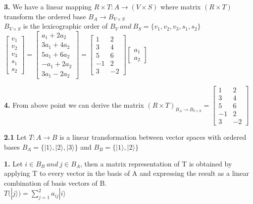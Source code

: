 \documentclass [12pt]{article}
\theoremstyle{definition}
\begin{document}
\phantom{1em} {\bf 3.} We have a linear mapping $R \times T : A \rightarrow (V \times S)$ where matrix $(R \times T)$ transform the ordered base $B_{A} \rightarrow B_{V \times S}$ \\
\phantom{1000em} $B_{V \times S}$ is the lexicographic order of $B_{V} \ and \ B_{S} = \{ v_{1}, v_{2}, v_{3}, s_{1}, s_{2}\}$ \\
\phantom{1000em} $ \begin{bmatrix} v_{1} \\ v_{2} \\ v_{3} \\ s_{1} \\ s_{2} \end{bmatrix} = \begin{bmatrix} a_{1} + 2a_{2}\\ 3a_{1} + 4a_{2} \\ 5a_{1} + 6a_{2} \\ -a_{1} + 2a_{2} \\ 3a_{1} - 2a_{2} \end{bmatrix} =  \begin{bmatrix}  1 & 2 \\ 3 & 4 \\ 5 & 6 \\ -1 & 2 \\ 3 & -2\end{bmatrix} \begin{bmatrix} a_{1} \\ a_{2} \end{bmatrix}$

\phantom{1em} {\bf 4.} From above point we can derive the matrix $(R \times T)_{B_{A} \rightarrow B_{V \times S}} = \begin{bmatrix}  1 & 2 \\ 3 & 4 \\ 5 & 6 \\ -1 & 2 \\ 3 & -2\end{bmatrix}$

{\bf 2.1} Let $T : A \rightarrow B$ is a linear transformation between vector spaces with ordered bases $B_{A} = \{|1\rangle, |2\rangle, |3\rangle \}$ and $B_{B} = \{|1\rangle, |2\rangle\}$

\phantom{1em} {\bf 1.} Let $i \in B_{B} \ and \ j \in B_{A}$, then a matrix representation of T is obtained by applying T to every vector in the basis of A and expressing the result as a linear combination of basis vectors of B.\\
\phantom{1000em} $T(|j \rangle) = \sum\limits_{j=1}^2 a_{ij} |i \rangle$
\end{document}
